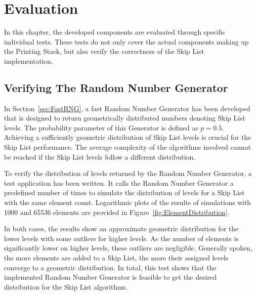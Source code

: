 \chapter{Evaluation}
In this chapter, the developed components are evaluated through specific individual tests.
These tests do not only cover the actual components making up the Printing Stack, but also verify the correctness of the Skip List implementation.


\section{Verifying The Random Number Generator}
In Section~\ref{sec:FastRNG}, a fast Random Number Generator has been developed that is designed to return geometrically distributed numbers denoting Skip List levels.
The probability parameter of this Generator is defined as $p = 0.5$.
Achieving a sufficiently geometric distribution of Skip List levels is crucial for the Skip List performance.
The average complexity of the algorithms involved cannot be reached if the Skip List levels follow a different distribution.

To verify the distribution of levels returned by the Random Number Generator, a test application has been written.
It calls the Random Number Generator a predefined number of times to simulate the distribution of levels for a Skip List with the same element count.
Logarithmic plots of the results of simulations with 1000 and 65536 elements are provided in Figure~\ref{fig:ElementDistribution}.

In both cases, the results show an approximate geometric distribution for the lower levels with some outliers for higher levels.
As the number of elements is significantly lower on higher levels, these outliers are negligible.
Generally spoken, the more elements are added to a Skip List, the more their assigned levels converge to a geometric distribution.
In total, this test shows that the implemented Random Number Generator is feasible to get the desired distribution for the Skip List algorithms.

